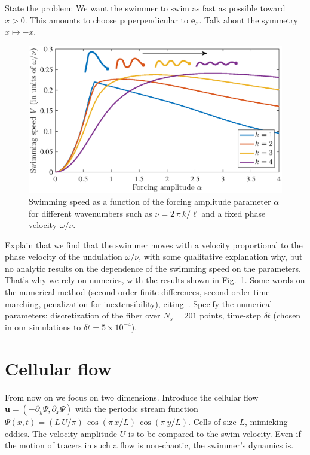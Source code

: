 \documentclass[prl,aps,superscriptaddress,twocolumn]{revtex4-1}
\begin{document}
State the problem: We want the swimmer to swim as fast as possible toward $x>0$. This amounts to choose $\bm p$ perpendicular to $\bm e_x$. Talk about the symmetry $x\mapsto-x$.

\begin{figure}[ht]
  \centerline{\includegraphics[width=\columnwidth]{swimming_speed_nofluid}}
  \caption{\label{fig:swimming_speed_nofluid} Swimming speed as a function of the forcing amplitude parameter $\alpha$ for different wavenumbers such as $\nu = 2\,\pi\,k/\ell$ and a fixed phase velocity $\omega/\nu$.}
\end{figure}
Explain that we find that the swimmer moves with a velocity proportional to the phase velocity of the undulation $\omega/\nu$, with some qualitative explanation why, but no analytic results on the dependence of the swimming speed on the parameters. That's why we rely on numerics, with the results shown in Fig.~\ref{fig:swimming_speed_nofluid}.
Some words on the numerical method (second-order finite differences, second-order time marching, penalization for inextensibility), citing~\cite{tornberg2004simulating}. Specify the numerical parameters: discretization of the fiber over $N_s = 201$ points, time-step $\delta t$ (chosen in our simulations to $\delta t = 5\times10^{-4}$).

\section{Cellular flow}

From now on we focus on two dimensions. Introduce the cellular flow $\bm u = (-\partial_y\Psi,\partial_x\Psi)$ with the periodic stream function $\Psi(x,t) = (L\,U/\pi)\,\cos(\pi\,x/L)\,\cos(\pi\,y/L)$. Cells of size $L$, mimicking eddies. The velocity amplitude $U$ is to be compared to the swim velocity. Even if the motion of tracers in such a flow is non-chaotic, the swimmer's dynamics is.  
\end{document}
